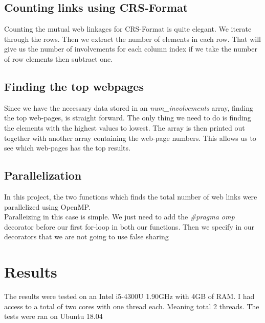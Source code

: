 \documentclass{article}
\begin{document}
\subsection{Counting links using CRS-Format}

Counting the mutual web linkages for CRS-Format is quite elegant. We iterate through the rows. Then we extract the number of elements in each row. That will give us the number of involvements for each column index if we take the number of row elements then subtract one. 

\subsection{Finding the top webpages}

Since we have the necessary data stored in an \textit{num\_involvements} array, finding the top web-pages, is straight forward. The only thing we need to do is finding the elements with the highest values to lowest. The array is then printed out together with another array containing the web-page numbers. This allows us to see which web-pages has the top results.

\subsection{Parallelization}

In this project, the two functions which finds the total number of web links were parallelized using OpenMP. \\
Paralleizing in this case is simple. We just need to add the \textit{#pragma omp} decorator before our first for-loop in both our functions. Then we specify in our decorators that we are not going to use false sharing



\section{Results}
The results were tested on an Intel i5-4300U 1.90GHz with 4GB of RAM. I had access to a total of two cores with one thread each. Meaning total 2 threads. The tests were ran on Ubuntu 18.04
\end{document}
